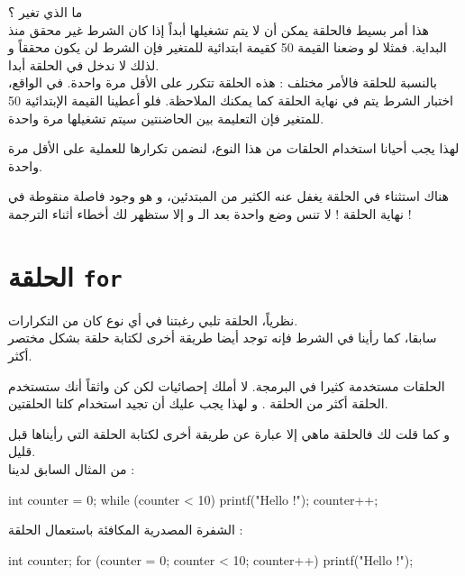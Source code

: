 ما الذي تغير ؟\\
هذا أمر بسيط فالحلقة 
يمكن أن لا يتم تشغيلها أبداً إذا كان الشرط غير محقق منذ البداية. فمثلا لو وضعنا القيمة 50 كقيمة ابتدائية للمتغير 
فإن الشرط لن يكون محققاً و لذلك لا ندخل في الحلقة أبدا.\\
بالنسبة للحلقة 
فالأمر مختلف : هذه الحلقة تتكرر على الأقل مرة واحدة. في الواقع، اختبار الشرط يتم في نهاية الحلقة كما يمكنك الملاحظة. فلو أعطينا القيمة الإبتدائية 50 للمتغير 
فإن التعليمة بين الحاضنتين سيتم تشغيلها مرة واحدة. 

لهذا يجب أحيانا استخدام الحلقات من هذا النوع، لنضمن تكرارها للعملية على الأقل مرة واحدة.

\begin{warning}
هناك استثناء في الحلقة 
يغفل عنه الكثير من المبتدئين، و هو وجود فاصلة منقوطة في نهاية الحلقة ! لا تنس وضع واحدة بعد الـ
و إلا ستظهر لك أخطاء أثناء الترجمة !
\end{warning}

\section{الحلقة \texttt{for}}

نظرياً، الحلقة 
تلبي رغبتنا في أي نوع كان من التكرارات.\\
سابقا، كما رأينا في الشرط 
فإنه توجد أيضا  طريقة أخرى لكتابة حلقة بشكل مختصر أكثر.

الحلقات 
مستخدمة كثيرا في البرمجة. لا أملك إحصائيات لكن كن واثقاً أنك ستستخدم الحلقة 
أكثر من الحلقة 
.
و لهذا يجب عليك أن تجيد استخدام كلتا الحلقتين.

و كما قلت لك فالحلقة 
ماهي إلا عبارة عن طريقة أخرى لكتابة الحلقة
التي رأيناها قبل قليل.\\
من المثال السابق لدينا :

\begin{Csource}
int counter = 0;
while (counter < 10)
{
	printf("Hello !\n");
	counter++;
}
\end{Csource}

الشفرة المصدرية المكافئة باستعمال الحلقة
 :

\begin{Csource}
int counter;
for (counter = 0; counter < 10; counter++)
{
	printf("Hello !\n");
}
\end{Csource}

